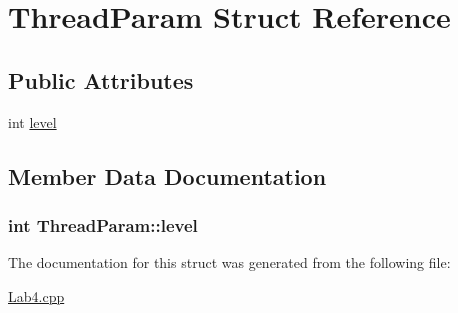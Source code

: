 \hypertarget{structThreadParam}{}\section{Thread\+Param Struct Reference}
\label{structThreadParam}
\subsection*{Public Attributes}
\begin{DoxyCompactItemize}
\item 
int \hyperlink{structThreadParam_af65f9da248fc152676a9e6040138515b}{level}
\end{DoxyCompactItemize}


\subsection{Member Data Documentation}
\subsubsection[{\texorpdfstring{level}{level}}]{\setlength{\rightskip}{0pt plus 5cm}int Thread\+Param\+::level}\hypertarget{structThreadParam_af65f9da248fc152676a9e6040138515b}{}\label{structThreadParam_af65f9da248fc152676a9e6040138515b}


The documentation for this struct was generated from the following file\+:\begin{DoxyCompactItemize}
\item 
\hyperlink{Lab4_8cpp}{Lab4.\+cpp}\end{DoxyCompactItemize}
